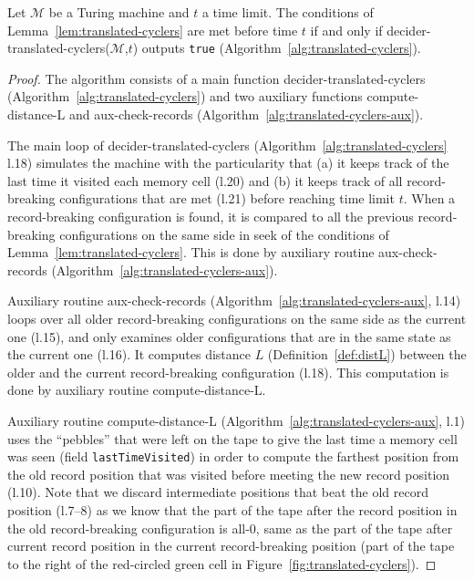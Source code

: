 \begin{theorem}\label{th:translated-cyclers}
  Let $\mathcal{M}$ be a Turing machine and $t$ a time limit. The conditions of Lemma~\ref{lem:translated-cyclers} are met before time $t$ if and only if {\sc decider-translated-cyclers}($\mathcal{M}$,$t$) outputs \texttt{true} (Algorithm~\ref{alg:translated-cyclers}).
\end{theorem}
\begin{proof}
  The algorithm consists of a main function {\sc decider-translated-cyclers} (Algorithm~\ref{alg:translated-cyclers}) and two auxiliary functions {\sc compute-distance-L} and {\sc aux-check-records} (Algorithm~\ref{alg:translated-cyclers-aux}).

  The main loop of {\sc decider-translated-cyclers} (Algorithm~\ref{alg:translated-cyclers} l.18) simulates the machine with the particularity that (a) it keeps track of the last time it visited each memory cell (l.20) and (b) it keeps track of all record-breaking configurations that are met (l.21) before reaching time limit $t$. When a record-breaking configuration is found, it is compared to all the previous record-breaking configurations on the same side in seek of the conditions of Lemma~\ref{lem:translated-cyclers}. This is done by auxiliary routine {\sc aux-check-records} (Algorithm~\ref{alg:translated-cyclers-aux}).

  Auxiliary routine {\sc aux-check-records} (Algorithm~\ref{alg:translated-cyclers-aux}, l.14) loops over all older record-breaking configurations on the same side as the current one (l.15), and only examines older configurations that are in the same state as the current one (l.16). It computes distance $L$ (Definition~\ref{def:distL}) between the older and the current record-breaking configuration (l.18). This computation is done by auxiliary routine {\sc compute-distance-L}.

  Auxiliary routine {\sc compute-distance-L} (Algorithm~\ref{alg:translated-cyclers-aux}, l.1) uses the ``pebbles'' that were left on the tape to give the last time a memory cell was seen (field \texttt{lastTimeVisited}) in order to compute the farthest position from the old record position that was visited before meeting the new record position (l.10). Note that we discard intermediate positions that beat the old record position (l.7--8) as we know that the part of the tape after the record position in the old record-breaking configuration is all-0, same as the part of the tape after current record position in the current record-breaking position (part of the tape to the right of the red-circled green cell in Figure~\ref{fig:translated-cyclers}).


\end{proof}
